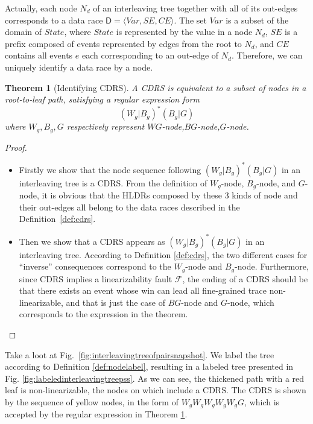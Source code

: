 \documentclass[runningheads]{llncs}
\newcommand{\pair}[1]{{\langle{#1}\rangle}}
\newtheorem{myTheo}{Theorem}
\begin{document}
Actually, each node $N_d$ of an interleaving tree together with all of its out-edges corresponds to a data race $\mathsf{D} = \pair{\mathit{Var}, \mathit{SE},\mathit{CE}}$. The set $\mathit{Var}$ is a subset of the domain of $\mathit{State}$, where $\mathit{State}$ is represented by the value in a node $N_d$, $\mathit{SE}$ is a prefix composed of events represented by edges from the root to $N_d$, and $\mathit{CE}$ contains all events $e$ each corresponding to an out-edge of $N_d$. Therefore, we can uniquely identify a data race by a node.

\begin{myTheo}[Identifying CDRS]\label{theo:idenfycdrs}
    A CDRS is equivalent to a subset of nodes in a root-to-leaf path, satisfying a regular expression form
    $$(W_g|B_g)^*(B_g|G)$$
    where $W_g,B_g,G$ respectively represent $\mathit{WG}$-node,$\mathit{BG}$-node,$\mathit{G}$-node.
\end{myTheo}





\begin{proof}



\begin{itemize}
\item Firstly we show that the node sequence following $(W_g|B_g)^*(B_g|G)$ in an interleaving tree is a CDRS.
From the definition of $W_g$-node, $B_g$-node, and $G$-node, it is obvious that the HLDRs composed by these 3 kinds of node and their out-edges all belong to the
data races described in the Definition~\ref{def:cdrs}.

\item Then we show that a CDRS appears as $(W_g|B_g)^*(B_g|G)$ in an interleaving tree.
According to Definition \ref{def:cdrs}, the two different cases for ``inverse'' consequences correspond to 
the $W_g$-node and $B_g$-node. Furthermore, since CDRS implies a linearizability fault $\mathcal{F}$, the ending of a CDRS 
should be that there exists an event whose win can lead all fine-grained trace non-linearizable, and that is just the case of $BG$-node 
and $G$-node, which corresponds to the expression in the theorem.
\end{itemize}
 
 \end{proof}








\begin{example}
Take a loot at Fig.~\ref{fig:interleavingtreeofpairsnapshot}.  We label the tree according to Definition \ref{def:nodelabel}, resulting in a labeled tree presented in Fig. \ref{fig:labeledinterleavingtreepss}.  As we can see, the thickened path with a red leaf is non-linearizable, the nodes on which include a CDRS. The CDRS is shown by the sequence of yellow nodes, in the form of $\mathit{W_gW_gW_gW_gW_gG}$, which is accepted by the regular expression in Theorem \ref{theo:idenfycdrs}.

\end{example}
\end{document}
